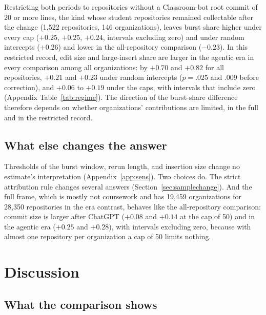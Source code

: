 \documentclass[acmsmall,screen,review,anonymous]{acmart}
\begin{document}
Restricting both periods to repositories without a Classroom-bot root commit of 20 or more lines, the kind whose student repositories remained collectable after the change (1,522 repositories, 146 organizations), leaves burst share higher under every cap ($+0.25$, $+0.25$, $+0.24$, intervals excluding zero) and under random intercepts ($+0.26$) and lower in the all-repository comparison ($-0.23$). In this restricted record, edit size and large-insert share are larger in the agentic era in every comparison among all organizations: by $+0.70$ and $+0.82$ for all repositories, $+0.21$ and $+0.23$ under random intercepts ($p = .025$ and $.009$ before correction), and $+0.06$ to $+0.19$ under the caps, with intervals that include zero (Appendix Table~\ref{tab:regime}). The direction of the burst-share difference therefore depends on whether organizations' contributions are limited, in the full and in the restricted record.

\subsection{What else changes the answer}
\label{sec:robust}

Thresholds of the burst window, rerun length, and insertion size change no estimate's interpretation (Appendix~\ref{app:sens}). Two choices do. The strict attribution rule changes several answers (Section~\ref{sec:samplechange}). And the full frame, which is mostly not coursework and has 19,459 organizations for 28,350 repositories in the era contrast, behaves like the all-repository comparison: commit size is larger after ChatGPT ($+0.08$ and $+0.14$ at the cap of 50) and in the agentic era ($+0.25$ and $+0.28$), with intervals excluding zero, because with almost one repository per organization a cap of 50 limits nothing.

\section{Discussion}
\label{sec:discussion}

\subsection{What the comparison shows}
\end{document}
